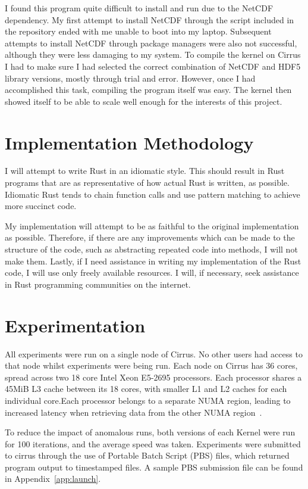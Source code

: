 I found this program quite difficult to install and run due to the NetCDF dependency. My first attempt to install NetCDF through the script included in the repository ended with me unable to boot into my laptop. Subsequent attempts to install NetCDF through package managers were also not successful, although they were less damaging to my system. To compile the kernel on Cirrus I had to make sure I had selected the correct combination of NetCDF and HDF5 library versions, mostly through trial and error. However, once I had accomplished this task, compiling the program itself was easy. The kernel then showed itself to be able to scale well enough for the interests of this project.

\section{Implementation Methodology}
I will attempt to write Rust in an idiomatic style. This should result in Rust programs that are as representative of how actual Rust is written, as possible. Idiomatic Rust tends to chain function calls and use pattern matching to achieve more succinct code.

My implementation will attempt to be as faithful to the original implementation as possible. Therefore, if there are any improvements which can be made to the structure of the code, such as abstracting repeated code into methods, I will not make them. Lastly, if I need assistance in writing my implementation of the Rust code, I will use only freely available resources. I will, if necessary, seek assistance in Rust programming communities on the internet.


\section{Experimentation}
All experiments were run on a single node of Cirrus. No other users had access to that node whilst experiments were being run. Each node on Cirrus has 36 cores, spread across two 18 core Intel Xeon E5-2695 processors. Each processor shares a 45MiB L3 cache between its 18 cores, with smaller L1 and L2 caches for each individual core.Each processor belongs to a separate NUMA region, leading to increased latency when retrieving data from the other NUMA region~\cite{CirrusHardware}.

To reduce the impact of anomalous runs, both versions of each Kernel were run for 100 iterations, and the average speed was taken. Experiments were submitted to cirrus through the use of Portable Batch Script (PBS) files, which returned program output to timestamped files. A sample PBS submission file can be found in Appendix~\ref{app:launch}.

